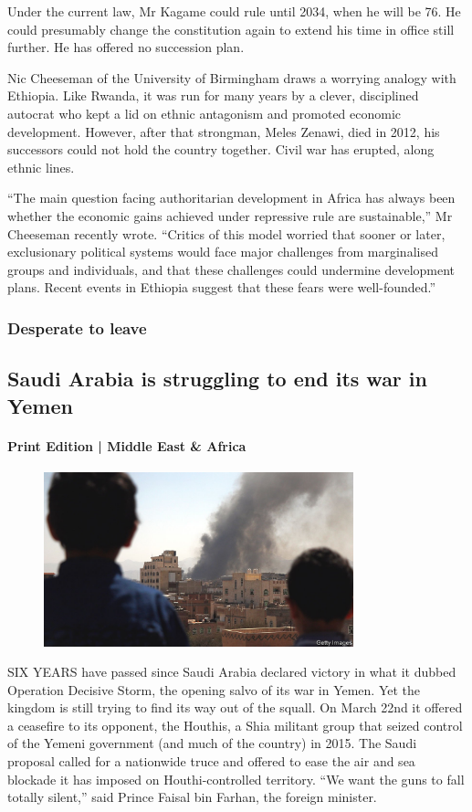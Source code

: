 \documentclass{article}
\begin{document}
Under the current law, Mr Kagame could rule until 2034, when he will be 76. He could presumably change the constitution again to extend his time in office still further. He has offered no succession plan. 

Nic Cheeseman of the University of Birmingham draws a worrying analogy with Ethiopia. Like Rwanda, it was run for many years by a clever, disciplined autocrat who kept a lid on ethnic antagonism and promoted economic development. However, after that strongman, Meles Zenawi, died in 2012, his successors could not hold the country together. Civil war has erupted, along ethnic lines. 

``The main question facing authoritarian development in Africa has always been whether the economic gains achieved under repressive rule are sustainable,'' Mr Cheeseman recently wrote. ``Critics of this model worried that sooner or later, exclusionary political systems would face major challenges from marginalised groups and individuals, and that these challenges could undermine development plans. Recent events in Ethiopia suggest that these fears were well-founded.'' {} 
\clearpage
\subsubsection{Desperate to leave }
\subsection{Saudi Arabia is struggling to end its war in Yemen }
\paragraph{Print Edition | Middle East \& Africa  \quad \color{gray}{Mar 27th 2021 }}
\begin{figure}[h]
\centering
\includegraphics[width=0.8\textwidth]{images/20210327_MAP003_0.jpg}
\end{figure}
\lettrine{S}IX YEARS have passed since Saudi Arabia declared victory in what it dubbed Operation Decisive Storm, the opening salvo of its war in Yemen. Yet the kingdom is still trying to find its way out of the squall. On March 22nd it offered a ceasefire to its opponent, the Houthis, a Shia militant group that seized control of the Yemeni government (and much of the country) in 2015. The Saudi proposal called for a nationwide truce and offered to ease the air and sea blockade it has imposed on Houthi-controlled territory. ``We want the guns to fall totally silent,'' said Prince Faisal bin Farhan, the foreign minister. 
\end{document}
